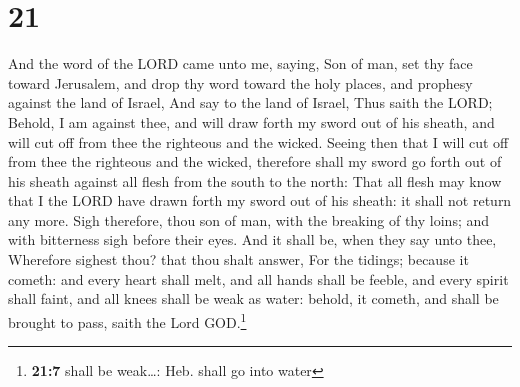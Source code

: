 \hypertarget{section-20}{%
\section{21}\label{section-20}}

 And the word of the LORD came unto me, saying,
 Son of man, set thy face toward Jerusalem, and drop thy
word toward the holy places, and prophesy against the land of Israel,
 And say to the land of Israel, Thus saith the LORD;
Behold, I am against thee, and will draw forth my sword out of his
sheath, and will cut off from thee the righteous and the wicked.
 Seeing then that I will cut off from thee the righteous
and the wicked, therefore shall my sword go forth out of his sheath
against all flesh from the south to the north:  That all
flesh may know that I the LORD have drawn forth my sword out of his
sheath: it shall not return any more.  Sigh therefore,
thou son of man, with the breaking of thy loins; and with bitterness
sigh before their eyes.  And it shall be, when they say
unto thee, Wherefore sighest thou? that thou shalt answer, For the
tidings; because it cometh: and every heart shall melt, and all hands
shall be feeble, and every spirit shall faint, and all knees shall be
weak as water: behold, it cometh, and shall be brought to pass, saith
the Lord GOD.\footnote{\textbf{21:7} shall be weak\ldots: Heb. shall go
  into water}

